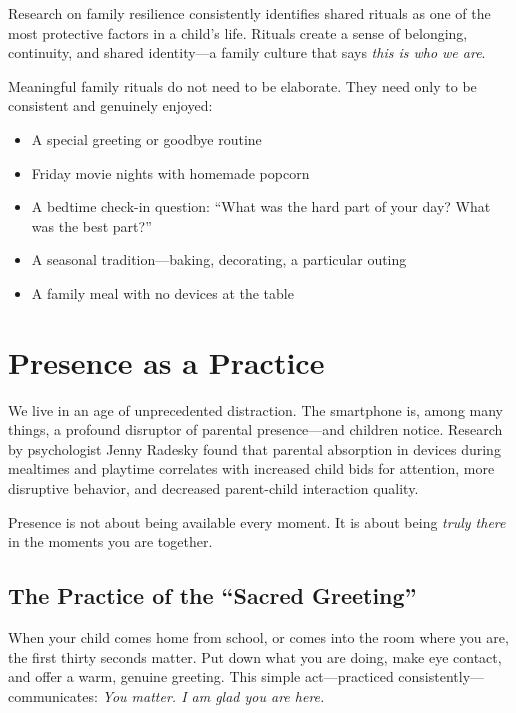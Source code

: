 Research on family resilience consistently identifies shared rituals as
one of the most protective factors in a child's life. Rituals create a
sense of belonging, continuity, and shared identity---a family culture
that says \textit{this is who we are}.

Meaningful family rituals do not need to be elaborate. They need only to
be consistent and genuinely enjoyed:

\begin{itemize}
  \item A special greeting or goodbye routine
  \item Friday movie nights with homemade popcorn
  \item A bedtime check-in question: ``What was the hard part of your
        day? What was the best part?''
  \item A seasonal tradition---baking, decorating, a particular outing
  \item A family meal with no devices at the table
\end{itemize}

\section{Presence as a Practice}

We live in an age of unprecedented distraction. The smartphone is, among
many things, a profound disruptor of parental presence---and children
notice. Research by psychologist Jenny Radesky found that parental
absorption in devices during mealtimes and playtime correlates with
increased child bids for attention, more disruptive behavior, and
decreased parent-child interaction quality.

Presence is not about being available every moment. It is about being
\textit{truly there} in the moments you are together.

\subsection{The Practice of the ``Sacred Greeting''}

When your child comes home from school, or comes into the room where you
are, the first thirty seconds matter. Put down what you are doing, make
eye contact, and offer a warm, genuine greeting. This simple act---practiced
consistently---communicates: \textit{You matter. I am glad you are here.}

